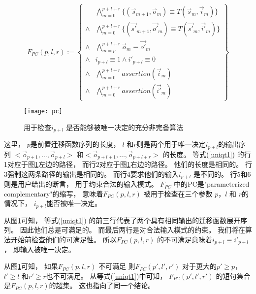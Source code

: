 \begin{equation}\label{uniqt1}
F_{PC}(p,l,r):=
\left\{
\begin{array}{cc}
&\bigwedge_{m=0}^{p+l+r}
\{
(\vec{s}_{m+1},\vec{o}_m)\equiv T(\vec{s}_m,\vec{i}_m)
\}
\\
\wedge&\bigwedge_{m=0}^{p+l+r}
\{
(\vec{s'}_{m+1},\vec{o'}_m)\equiv T(\vec{s'}_m,\vec{i'}_m)
\}
\\
\wedge&\bigwedge_{m=p}^{p+l+r}\vec{o}_m\equiv \vec{o'}_m \\
\wedge& i_{p+l}\equiv 1 \wedge  i'_{p+l}\equiv 0 \\
\wedge&\bigwedge_{m=0}^{p+l+r}assertion(\vec{i}_m) \\
\wedge&\bigwedge_{m=0}^{p+l+r}assertion(\vec{i'}_m)
\end{array}
\right\}
\end{equation}

\begin{figure}[t]
\begin{center}
\texttt{[image: pc]}
\end{center}
\caption{用于检查$i_{p+l}$ 是否能够被唯一决定的充分非完备算法}
  \label{fig_pc_double}
\end{figure}


这里，
$p$是前置迁移函数序列的长度，
$l$ 和$r$则是两个用于唯一决定$i_{p+l}$的输出序列
$<\vec{o}_{p+1},\dots,\vec{o}_{p+l}>$ 和$<\vec{o}_{p+l+1},\dots,\vec{o}_{p+l+r}>$
的长度。
等式(\ref{uniqt1}) 的行1对应于图\ref{fig_pc_double}左边的路径，
而行2对应于图\ref{fig_pc_double}右边的路径。
他们的长度是相同的。
行3强制这两条路径的输出是相同的。
而行4要求他们的输入$i_{p+l}$ 是不同的。
行5和6则是用户给出的断言，
用于约束合法的输入模式。
$F_{PC}$ 中的PC是"parameterized complementary"的缩写，
意味着$F_{PC}(p,l,r)$ 被用于检查在三个参数 $p$，$l$ 和 $r$的情况下，
$i_{p+l}$能否被唯一决定。


从图\ref{fig_pc_double}可知，
等式(\ref{uniqt1}) 的前三行代表了两个具有相同输出的迁移函数展开序列。
因此他们总是可满足的。
而最后两行是对合法输入模式的约束。
我们将在算法开始前检查他们的可满足性。
所以$F_{PC}(p,l,r)$ 的不可满足意味着$i_{p+l}\equiv i'_{p+l}$，
即输入被唯一决定。

从图\ref{fig_pc_double}可知，
如果$F_{PC}(p,l,r)$ 不可满足
则$F_{PC}(p',l',r')$ 对于更大的$p'\ge p$， $l'\ge l$ 和$r'\ge r$也不可满足。
从等式(\ref{uniqt1})中可知，
$F_{PC}(p',l',r')$ 的短句集合是$F_{PC}(p,l,r)$的超集。
这也指向了同一个结论。

